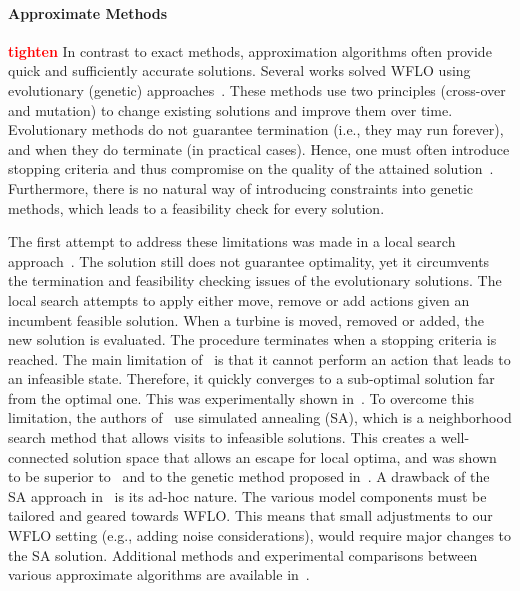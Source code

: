 \documentclass[preprint,12pt]{elsarticle}
\newcommand{\todo}[1]{{\textcolor{red}{\bf {#1}}}}
\begin{document}
\paragraph{Approximate Methods} \todo{tighten} In contrast to exact methods, approximation algorithms often provide   
quick and sufficiently accurate solutions. Several works solved 
WFLO using evolutionary (genetic) approaches~\cite{MOSETTI1994105,gonzalez2010optimization,grady2005placement}. These methods use two principles (cross-over and mutation)
to change existing solutions and improve them over time. Evolutionary methods do not guarantee termination (i.e., they may run forever), and when they do terminate (in practical cases). Hence, one must often
introduce stopping criteria and thus compromise on the quality of the attained solution~\cite{davis1991handbook}.
Furthermore, there is no natural way of introducing constraints into genetic methods, which
leads to a feasibility check for every solution. 

The first attempt to address these limitations 
was made in a local search approach~\cite{ozturk2004heuristic}. 
The solution still does not guarantee optimality, 
yet it circumvents the termination and feasibility checking issues of the evolutionary
solutions. The local search attempts to apply either move, remove or add actions given an incumbent 
feasible solution. When a turbine is moved, removed or added, the new solution is evaluated. The procedure terminates 
when a stopping criteria is reached.
The main limitation of~\cite{ozturk2004heuristic} is that it cannot perform an action 
that leads to an infeasible state. Therefore, it quickly converges to a sub-optimal solution far
from the optimal one. This was experimentally shown in~\cite{rivas2009solving}. To overcome this limitation, the authors of~\cite{rivas2009solving} use simulated annealing (SA), which is a neighborhood search method that allows visits to infeasible solutions. This creates a well-connected solution space that allows an escape for local optima, and was shown to be superior to~\cite{ozturk2004heuristic} and to the genetic method proposed in~\cite{grady2005placement}. A drawback of the SA approach in~\cite{rivas2009solving} is its ad-hoc nature. The various model components must be tailored and geared towards WFLO. This means that small adjustments to our WFLO setting
 (e.g., adding noise considerations), would require major changes to the SA solution. 
Additional methods and experimental comparisons between various approximate algorithms are available in~\cite{samorani2013wind}.
\end{document}
